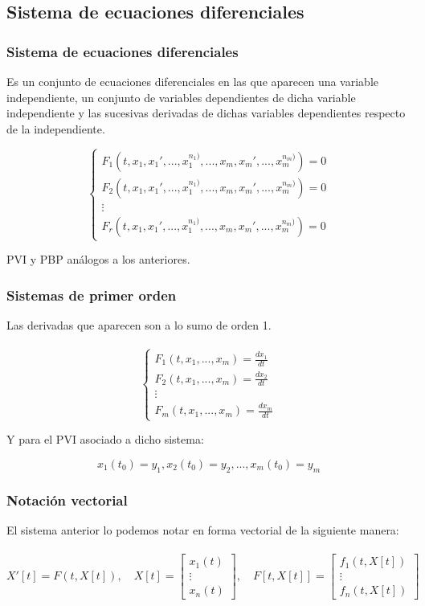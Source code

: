 \documentclass{beamer}
\begin{document}
\subsection{Sistema de ecuaciones diferenciales}
\begin{frame}
	\frametitle{Sistema de ecuaciones diferenciales}
	
	Es un conjunto de ecuaciones diferenciales en las que aparecen una variable independiente, un conjunto de variables dependientes de dicha variable independiente y las sucesivas derivadas de dichas variables dependientes respecto de la independiente. 
	
	$$
	\begin{cases}
	F_1(t, x_1, x_1', ..., x_1^{n_1)}, ..., x_m, x_m', ..., x_m^{n_m)}) = 0 \\
	F_2(t, x_1, x_1', ..., x_1^{n_1)}, ..., x_m, x_m', ..., x_m^{n_m)}) = 0 \\
	\vdots \\
	F_r(t, x_1, x_1', ..., x_1^{n_1)}, ..., x_m, x_m', ..., x_m^{n_m)}) = 0
	\end{cases}
	$$
	
	PVI y PBP análogos a los anteriores.
\end{frame}

\begin{frame}
	\frametitle{Sistemas de primer orden}

	Las derivadas que aparecen son a lo sumo de orden 1.\\~\\
	
	$$
	\begin{cases}
	F_1(t, x_1, ..., x_m) = \frac{d x_1}{d t} \\
	F_2(t, x_1, ..., x_m) = \frac{d x_2}{d t} \\
	\vdots \\
	F_m(t, x_1, ..., x_m) = \frac{d x_m}{d t}
	\end{cases} 
	$$
	
	Y para el PVI asociado a dicho sistema: 
	
	$$ x_1(t_0) = y_1, x_2(t_0) = y_2, ..., x_m(t_0) = y_m $$
\end{frame}

\begin{frame}
	\frametitle{Notación vectorial}
	El sistema anterior lo podemos notar en forma vectorial de la siguiente manera:\\~\\

	$$ X'[t] = F(t, X[t]), \quad 
	X[t] = \begin{bmatrix}
    x_1(t) \\
    \vdots \\
    x_n(t)
    \end{bmatrix}, \quad
    F[t, X[t]] = \begin{bmatrix}
    f_1(t, X[t]) \\
    \vdots \\
    f_n(t, X[t])
    \end{bmatrix} $$
\end{frame}
\end{document}
